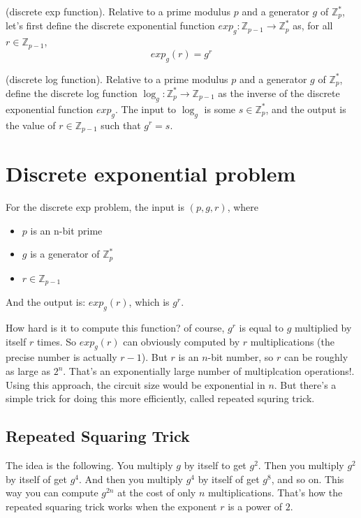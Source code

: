 \begin{definition}
    (discrete exp function). Relative to a prime modulus $p$ and a generator $g$ of $\mathbb{Z}_p^*$, let's first define the discrete exponential function $exp_g:\mathbb{Z}_{p-1}\rightarrow \mathbb{Z}_p^*$ as, for all $r \in\mathbb{Z}_{p-1}$,
    \[
    exp_g(r)=g^r
    \]
\end{definition}
\begin{definition}
    (discrete log function). Relative to a prime modulus $p$ and a generator $g$  of $\mathbb{Z}_p^*$, define the discrete log function  $\log_g:\mathbb{Z}_p^*\rightarrow \mathbb{Z}_{p-1}$ as the inverse of the discrete exponential function $exp_g$. The input to $\log_g$ is some $s\in\mathbb{Z}_p^*$, and the output is the value of $r\in\mathbb{Z}_{p-1}$ such that $g^r=s$.
\end{definition}

\section{Discrete exponential problem}
For the discrete exp problem, the input is $(p,g,r)$, where
\begin{itemize}
    \item $p$ is an n-bit prime
    \item $g$ is a generator of $\mathbb{Z}_p^*$
    \item $r \in \mathbb{Z}_{p-1}$
\end{itemize}
And the output is: $exp_g(r)$, which is $g^r$.

How hard is it to compute this function? of course, $g^r$ is equal to $g$ multiplied by itself $r$ times. So $exp_g(r)$ can obviously computed by $r$ multiplications (the precise number is actually $r-1$). But $r$ is an $n$-bit number, so $r$ can be roughly as large as $2^n$. That's an exponentially large number of multiplcation operations!. Using this approach, the circuit size would be exponential in $n$. But there's a simple trick for doing this more efficiently, called repeated squring trick.

\subsection{Repeated Squaring Trick}
\label{subsec:repeated_squaring_trick}
The idea is the following. You multiply $g$ by itself to get $g^2$. Then you multiply $g^2$ by itself of get $g^4$. And then you multiply $g^4$ by itself of get $g^8$, and so on. This way you can compute $g^{2n}$ at the cost of only $n$ multiplications. That's how the repeated squaring trick works when the exponent $r$ is a power of $2$.


